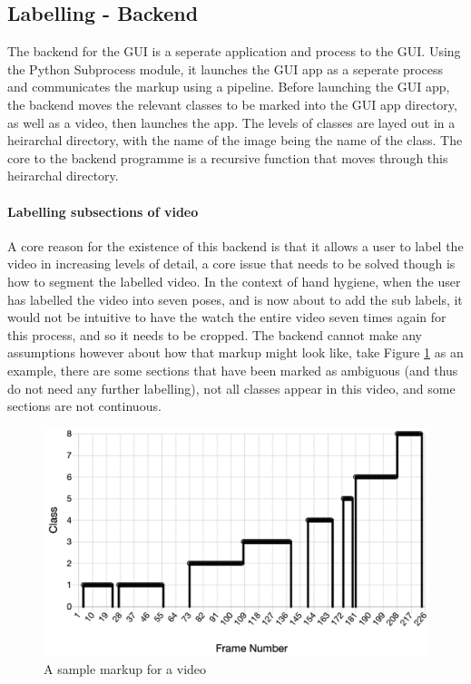     \subsection{Labelling - Backend}
    The backend for the GUI is a seperate application and process to the GUI. Using the Python Subprocess module, it launches the GUI app as a seperate process and communicates the markup using a pipeline. Before launching the GUI app, the backend moves the relevant classes to be marked into the GUI app directory, as well as a video, then launches the app. The levels of classes are layed out in a heirarchal directory, with the name of the image being the name of the class. The core to the backend programme is a recursive function that moves through this heirarchal directory.

    \paragraph{Labelling subsections of video}
    A core reason for the existence of this backend is that it allows a user to label the video in increasing levels of detail, a core issue that needs to be solved though is how to segment the labelled video. In the context of hand hygiene, when the user has labelled the video into seven poses, and is now about to add the sub labels, it would not be intuitive to have the watch the entire video seven times again for this process, and so it needs to be cropped. The backend cannot make any assumptions however about how that markup might look like, take Figure \ref{fig:labelsample} as an example, there are some sections that have been marked as ambiguous (and thus do not need any further labelling), not all classes appear in this video, and some sections are not continuous.

    \begin{figure}[h]
        \centering
        \includegraphics[width=450px]{../img/sample_label.png}
        \caption{A sample markup for a video}
        \label{fig:labelsample}
    \end{figure}

